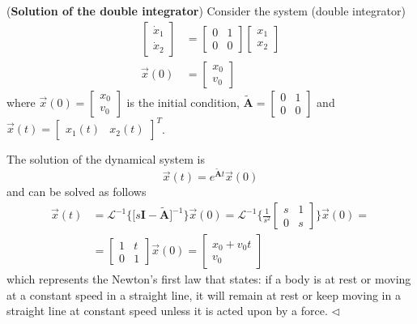 \documentclass[12pt,a4paper,oneside]{book}
\begin{document}
\begin{onehalfspace}
\begin{example}(\textbf{Solution of the double integrator})
	Consider the system (double integrator)
	\begin{equation}
		\begin{aligned}
			\begin{bmatrix} \dot{x}_1 \\ \dot{x}_2 \end{bmatrix} &= \begin{bmatrix} 0 & 1 \\ 0 & 0 \end{bmatrix} \begin{bmatrix} {x}_1 \\ {x}_2 \end{bmatrix} \\[6pt]
			\vec{x}(0) &= \begin{bmatrix} x_0 \\ v_0 \end{bmatrix}
		\end{aligned}
	\end{equation}
	where $\vec{x}(0)=\begin{bmatrix} x_0 \\ v_0 \end{bmatrix}$ is the initial condition, $\tilde{\mathbf{A}} = 
	\begin{bmatrix} 0 & 1 \\ 0 & 0 \end{bmatrix}$ and $\vec{x}(t)= \begin{bmatrix} 
		x_1(t) & x_2(t) \end{bmatrix}^T$.
	
	The solution of the dynamical system is 
	\begin{equation}
		\vec{x}(t) = e^{\tilde{\mathbf{A}}t}\vec{x}(0)
	\end{equation}
	and can be solved as follows
	\begin{equation}
		\begin{aligned}
			\vec{x}(t) &= 
			\mathcal{L}^{-1}\Big\{\Big[s\mathbf{I}-\tilde{\mathbf{A}}\Big]^{-1}\Big\}\vec{x}(0)
			= \mathcal{L}^{-1}\Big\{\frac{1}{s^2}\begin{bmatrix} s & 1 \\ 0 & s 
			\end{bmatrix}\Big\}\vec{x}(0) = \\[6pt]
			&= \begin{bmatrix} 1 & t \\ 0 & 1 \end{bmatrix}\vec{x}(0) = \begin{bmatrix} x_0+v_0t \\ v_0 \end{bmatrix}
		\end{aligned}
	\end{equation}
which represents the Newton’s first law that states: if a body is at rest or moving at a constant speed in a straight line, it will remain at rest or keep moving in a straight line at constant speed unless it is acted upon by a force.
$\triangleleft$
\end{example}


\end{onehalfspace}
\end{document}
